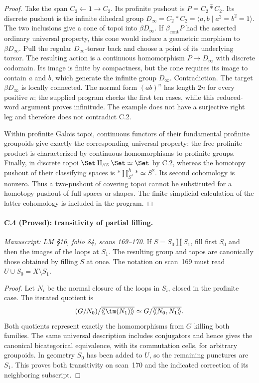 \begin{proof}
Take the span $C_2\leftarrow1\to C_2$. Its profinite
pushout is $P=C_2\widehat * C_2$. Its discrete pushout
is the infinite dihedral group
$D_\infty=C_2*C_2=\langle a,b\mid a^2=b^2=1\rangle$.
The two inclusions give a cone of topoi into
$\beta D_\infty$. If $\beta_{\mathrm{cont}}P$ had
the asserted ordinary universal property, this
cone would induce a geometric morphism to
$\beta D_\infty$. Pull the regular $D_\infty$-torsor
back and choose a point of its underlying torsor.
The resulting action is a continuous homomorphism
$P\to D_\infty$ with discrete codomain. Its image is
finite by compactness, but the cone requires its
image to contain $a$ and $b$, which generate the
infinite group $D_\infty$. Contradiction. The target
$\beta D_\infty$ is locally connected. The normal
form $(ab)^n$ has length $2n$ for every positive $n$;
the supplied program checks the first ten cases,
while this reduced-word argument proves infinitude.
The example does not have a surjective right leg
and therefore does not contradict C.2.

Within profinite Galois topoi, continuous functors
of their fundamental profinite groupoids give
exactly the corresponding universal property;
the free profinite product is characterized by
continuous homomorphisms to profinite groups.
Finally, in discrete topoi
$\Set\amalg_{\beta\mathbb Z}\Set\simeq\Set$ by C.2,
whereas the homotopy pushout of their classifying
spaces is $*\amalg^h_{S^1}*\simeq S^2$.
Its second cohomology is nonzero. Thus a
two-pushout of covering topoi cannot be substituted
for a homotopy pushout of full spaces or shapes.
The finite simplicial calculation of the latter
cohomology is included in the program.
\end{proof}

\paragraph{C.4 (Proved): transitivity of partial filling.}\label{C4}
\textit{Manuscript: LM \S16, folio 84, scans 169--170.}
If $S=S_0\amalg S_1$, fill first $S_0$ and then the
images of the loops at $S_1$. The resulting group
and topos are canonically those obtained by
filling $S$ at once. The notation on scan~169
must read $U\cup S_0=X\setminus S_1$.

\begin{proof}
Let $N_i$ be the normal closure of the loops in
$S_i$, closed in the profinite case. The iterated
quotient is
\[
 (G/N_0)/\overline{\langle\!\langle\im(N_1)\rangle\!\rangle}
 \simeq G/\overline{\langle\!\langle N_0,N_1\rangle\!\rangle}.
\]
Both quotients represent exactly the homomorphisms
from $G$ killing both families. The same universal
description includes conjugators and hence gives
the canonical bicategorical equivalence, with
its commutation cells, for arbitrary groupoids.
In geometry $S_0$ has been added to $U$, so the
remaining punctures are $S_1$. This proves both
transitivity on scan~170 and the indicated
correction of its neighboring subscript.
\end{proof}

